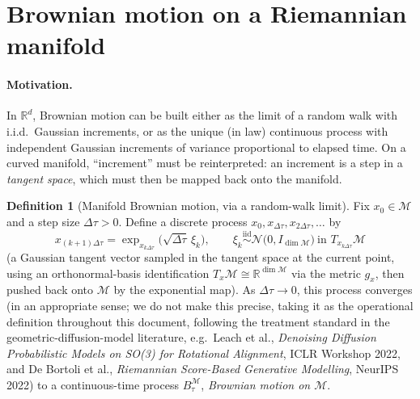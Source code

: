 \documentclass[11pt,a4paper]{report}
\theoremstyle{definition}
\newtheorem{definition}[definition]{Definition}
\theoremstyle{remark}
\newcommand{\RR}{\mathbb R}
\begin{document}
\section{Brownian motion on a Riemannian manifold}
\label{sec:manifold-brownian}

\paragraph{Motivation.} In $\RR^d$, Brownian motion can be built either as
the limit of a random walk with i.i.d.\ Gaussian increments, or as the
unique (in law) continuous process with independent Gaussian increments of
variance proportional to elapsed time. On a curved manifold, ``increment''
must be reinterpreted: an increment is a step in a \emph{tangent space},
which must then be mapped back onto the manifold.

\begin{definition}[Manifold Brownian motion, via a random-walk limit]
\label{def:manifold-brownian}
Fix $x_0\in\mathcal M$ and a step size $\Delta\tau>0$. Define a discrete
process $x_0,x_{\Delta\tau},x_{2\Delta\tau},\dots$ by
\[
x_{(k+1)\Delta\tau} = \exp_{x_{k\Delta\tau}}\bigl(\sqrt{\Delta\tau}\,\xi_k\bigr),
\qquad
\xi_k\overset{\mathrm{iid}}\sim\mathcal N\bigl(0,I_{\dim\mathcal M}\bigr)\ \text{in } T_{x_{k\Delta\tau}}\mathcal M
\]
(a Gaussian tangent vector sampled in the tangent space at the current
point, using an orthonormal-basis identification $T_x\mathcal M\cong\RR^{\dim\mathcal M}$
via the metric $g_x$, then pushed back onto $\mathcal M$ by the exponential
map). As $\Delta\tau\to0$, this process converges (in an appropriate sense;
we do not make this precise, taking it as the operational definition
throughout this document, following the treatment standard in the
geometric-diffusion-model literature, e.g.\ Leach et al., \emph{Denoising
Diffusion Probabilistic Models on SO(3) for Rotational Alignment}, ICLR
Workshop 2022, and De Bortoli et al., \emph{Riemannian Score-Based
Generative Modelling}, NeurIPS 2022) to a continuous-time process
$B^{\mathcal M}_\tau$, \emph{Brownian motion on $\mathcal M$}.
\end{definition}
\end{document}
